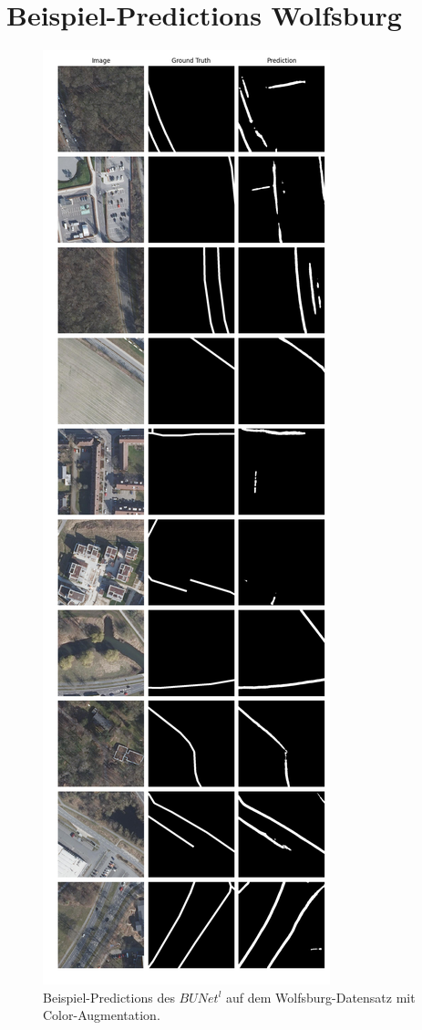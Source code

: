 \pagebreak 


\section{Beispiel-Predictions Wolfsburg} \label{sec:pred-wolfsburg}


\begin{figure}
	\centering
	\includegraphics[width=.41\textwidth]{Bilder/wolfsburg-color-samples/bunet15-l.png}
	\caption{Beispiel-Predictions des $BUNet^l$ auf dem Wolfsburg-Datensatz mit Color-Augmentation.}
	\label{fig:wolfsburg-color-samples-bunet15-l}
\end{figure}

